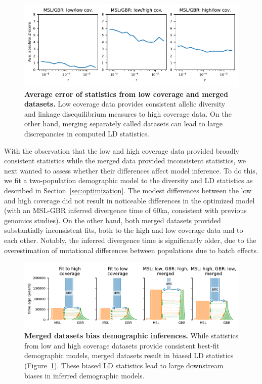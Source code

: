 \documentclass[]{article}
\begin{document}
\begin{figure}[ht!]
    \centering
    \includegraphics[width=5in]{figures/supp-SE-merged-data}
    \caption{
        \textbf{Average error of statistics from low coverage and merged datasets.}
        Low coverage data provides consistent allelic diversity and linkage
        disequilibrium measures to high coverage data. On the other hand,
        merging separately called datasets can lead to large discrepancies
        in computed LD statistics.
    }
    \label{fig:supp-merged-data-SEs}
\end{figure}

With the observation that the low and high coverage data provided broadly
consistent statistics while the merged data provided inconsistent statistics,
we next wanted to assess whether their differences affect model inference. To
do this, we fit a two-population demographic model to the diversity and LD
statistics as described in Section~\ref{sec:optimization}. The modest
differences between the low and high coverage did not result in noticeable
differences in the optimized model (with an MSL-GBR inferred divergence time of
60ka, consistent with previous genomics studies). On the other hand, both
merged datasets provided substantially inconsistent fits, both to the high and
low coverage data and to each other. Notably, the inferred divergence time is
significantly older, due to the overestimation of mutational differences
between populations due to batch effects.

\begin{figure}[ht!]
    \centering
    \includegraphics{figures/supp-merged-data-model-fits}
    \caption{
        \textbf{Merged datasets bias demographic inferences.}
        While statistics from low and high coverage datasets provide consistent
        best-fit demographic models, merged datasets result in biased LD
        statistics (Figure~\ref{fig:supp-merged-data-SEs}). These biased LD
        statistics lead to large downstream biases in inferred demographic
        models.
    }
    \label{fig:supp-merged-data-fits}
\end{figure}
\end{document}
